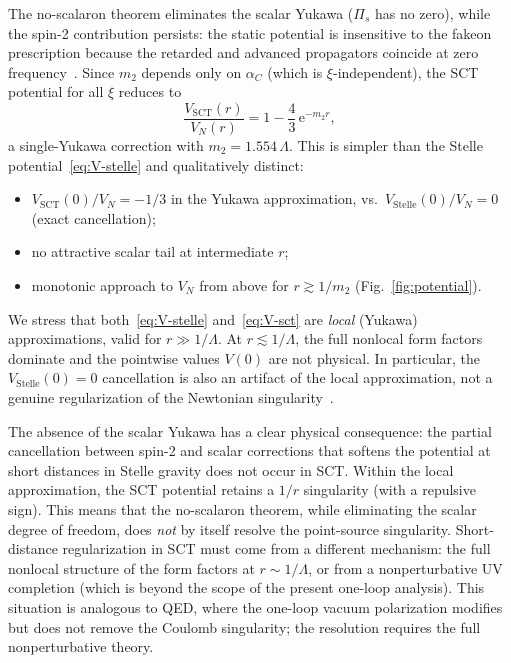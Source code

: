 \documentclass[12pt,a4paper]{article}
\newcommand{\Lam}{\Lambda}
\newcommand{\Pis}{\Pi_{s}}
\newcommand{\alphaC}{\alpha_C}
\newcommand{\ee}{\mathrm{e}}
\begin{document}
The no-scalaron theorem eliminates the scalar Yukawa
($\Pis$ has no zero), while the spin-2 contribution persists: the
static potential is insensitive to the fakeon prescription because
the retarded and advanced propagators coincide at zero
frequency~\cite{AP2018b}. Since $m_2$ depends only on $\alphaC$
(which is $\xi$-independent), the SCT potential for all $\xi$ reduces to
\begin{equation}\label{eq:V-sct}
  \boxed{\frac{V_{\mathrm{SCT}}(r)}{V_N(r)}
  = 1 - \frac{4}{3}\,\ee^{-m_2 r},}
\end{equation}
a single-Yukawa correction with $m_2 = 1.554\,\Lam$. This is simpler
than the Stelle potential~\eqref{eq:V-stelle} and qualitatively distinct:
\begin{itemize}
  \item $V_{\mathrm{SCT}}(0)/V_N = -1/3$ in the Yukawa approximation,
        vs.\ $V_{\mathrm{Stelle}}(0)/V_N = 0$ (exact cancellation);
  \item no attractive scalar tail at intermediate $r$;
  \item monotonic approach to $V_N$ from above for $r \gtrsim 1/m_2$
        (Fig.~\ref{fig:potential}).
\end{itemize}
We stress that both~\eqref{eq:V-stelle} and~\eqref{eq:V-sct} are
\emph{local} (Yukawa) approximations, valid for $r \gg 1/\Lam$. At
$r \lesssim 1/\Lam$, the full nonlocal form factors dominate and the
pointwise values $V(0)$ are not physical. In particular, the
$V_{\mathrm{Stelle}}(0) = 0$ cancellation is also an artifact of the
local approximation, not a genuine regularization of the Newtonian
singularity~\cite{Stelle1977}.

The absence of the scalar Yukawa has a clear physical consequence:
the partial cancellation between spin-2 and scalar corrections that
softens the potential at short distances in Stelle gravity does not
occur in SCT. Within the local approximation, the SCT potential
retains a $1/r$ singularity (with a repulsive sign). This means
that the no-scalaron theorem, while eliminating the scalar degree of
freedom, does \emph{not} by itself resolve the point-source
singularity. Short-distance regularization in SCT must come from a
different mechanism: the full nonlocal structure of the form factors
at $r \sim 1/\Lam$, or from a nonperturbative UV completion (which
is beyond the scope of the present one-loop analysis). This situation
is analogous to QED, where the one-loop vacuum polarization modifies
but does not remove the Coulomb singularity; the resolution requires
the full nonperturbative theory.
\end{document}
